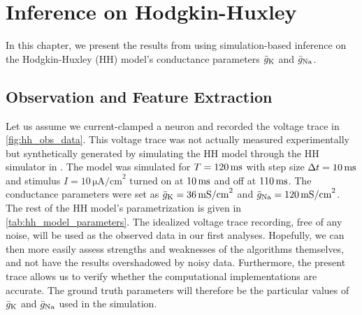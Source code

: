 \chapter{Inference on Hodgkin-Huxley}\label{chap:res_hh}

In this chapter, we present the results from using simulation-based inference on the Hodgkin-Huxley (HH) model's conductance parameters $\bar{g}_{\mathrm{K}}$ and $\bar{g}_{\mathrm{Na}}$. 







\section{Observation and Feature Extraction}

Let us assume we current-clamped a neuron and recorded the voltage trace in \autoref{fig:hh_obs_data}. This voltage trace was not actually measured experimentally but synthetically generated by simulating the HH model through the HH simulator in . The model was simulated for $T=120\,\mathrm{ms}$ with step size $\Delta t =10 \,\mathrm{ms}$ and stimulus $I = 10 \, \mathrm{\mu A/cm}^2$ turned on at $10 \,\mathrm{ms}$ and off at $110 \,\mathrm{ms}$. The conductance parameters were set as $\bar{g}_{\mathrm{K}}=36 \,\mathrm{mS/cm}^2$ and $\bar{g}_{\mathrm{Na}}=120 \,\mathrm{mS/cm}^2$. The rest of the HH model's parametrization is given in \autoref{tab:hh_model_parameters}. The idealized voltage trace recording, free of any noise, will be used as the observed data in our first analyses. Hopefully, we can then more easily assess strengths and weaknesses of the algorithms themselves, and not have the results overshadowed by noisy data. Furthermore, the present trace allows us to verify whether the computational implementations are accurate. The ground truth parameters will therefore be the particular values of $\bar{g}_{\mathrm{K}}$ and $\bar{g}_{\mathrm{Na}}$ used in the simulation.  

